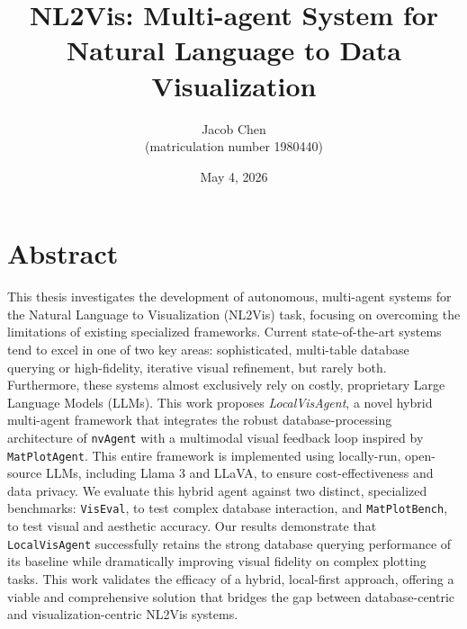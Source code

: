 \documentclass[a4paper,oneside,bibliography=totoc]{scrbook}
\begin{document}
\frontmatter \subject{Master Thesis} %
\title{NL2Vis: Multi-agent System for Natural Language to Data Visualization}
\author{Jacob Chen\\
  (matriculation number 1980440)} \date{May 4, 2026}
\publishers{{\small Submitted to}\\
  Social Data Science Group\\
  Prof.\ Dr.\ Marc Ratkovic\\
  University of Mannheim\\}
\maketitle

\chapter{Abstract}

This thesis investigates the development of autonomous, multi-agent systems for the Natural Language to Visualization (NL2Vis) task, focusing on overcoming the limitations of existing specialized frameworks. Current state-of-the-art systems tend to excel in one of two key areas: sophisticated, multi-table database querying or high-fidelity, iterative visual refinement, but rarely both. Furthermore, these systems almost exclusively rely on costly, proprietary Large Language Models (LLMs). This work proposes \emph{LocalVisAgent}, a novel hybrid multi-agent framework that integrates the robust database-processing architecture of \texttt{nvAgent} with a multimodal visual feedback loop inspired by \texttt{MatPlotAgent}. This entire framework is implemented using locally-run, open-source LLMs, including Llama 3 and LLaVA, to ensure cost-effectiveness and data privacy. We evaluate this hybrid agent against two distinct, specialized benchmarks: \texttt{VisEval}, to test complex database interaction, and \texttt{MatPlotBench}, to test visual and aesthetic accuracy. Our results demonstrate that \texttt{LocalVisAgent} successfully retains the strong database querying performance of its baseline while dramatically improving visual fidelity on complex plotting tasks. This work validates the efficacy of a hybrid, local-first approach, offering a viable and comprehensive solution that bridges the gap between database-centric and visualization-centric NL2Vis systems.

\begingroup
\hypersetup{hidelinks}%
\tableofcontents
\endgroup
\end{document}
